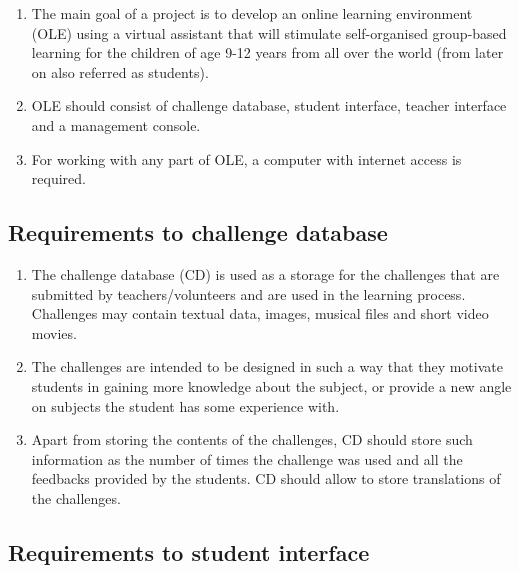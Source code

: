 \documentclass[a4paper]{article}
\begin{document}
\begin{enumerate}
\item The main goal of a project is to develop an online learning environment (OLE) using a virtual assistant that will stimulate self-organised group-based learning for the children of age 9-12 years from all over the world (from later on also referred as students).

\item OLE should consist of challenge database, student interface, teacher interface and a management console.

\item For working with any part of OLE, a computer with internet access is required.
\end{enumerate}

\subsection{Requirements to challenge database}

\begin{enumerate}
\item The challenge database (CD) is used as a storage for the challenges that are submitted by teachers/volunteers and are used in the learning process. Challenges may contain textual data, images, musical files and short video movies.

\item The challenges are intended to be designed in such a way that they motivate students in gaining more knowledge about the subject, or provide a new angle on subjects the student has some experience with.

\item Apart from storing the contents of the challenges, CD should store such information as the number of times the challenge was used and all the feedbacks provided by the students. CD should allow to store translations of the challenges.
\end{enumerate}

\subsection{Requirements to student interface}
\end{document}
